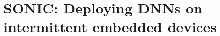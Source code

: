 \chapter{SONIC: Deploying DNNs on intermittent embedded devices}
\label{chapter:sonic}

\newcommand{\metric}{IMpJ\xspace}
\newcommand{\genesis}{{\sc Genesis}\xspace}
\newcommand{\tails}{{\protect\fauxsc{Tails}}\xspace}
\newcommand{\sonictails}{{\sonic}\,{\small\&}\,\tails}











